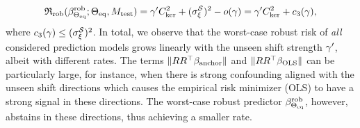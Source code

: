 \begin{equation*}
    \mathfrak{R}_{\mathrm{rob}}(\beta^{\mathrm{rob}}_{\Theta_{\mathrm{eq}}}; \Theta_{\mathrm{eq}}, M_{\mathrm{test}}) = \gamma' C_{\mathrm{ker}}^2 +  ({\sigma_\xi^{\mathcal{S}}})^2 - o(\gamma) = \gamma' C_{\mathrm{ker}}^2 + c_3(\gamma),
\end{equation*}
where $c_3(\gamma) \leq ({\sigma_\xi^{\mathcal{S}}})^2$.
In total, we observe that the worst-case robust risk of \emph{all} considered prediction models grows linearly with the unseen shift strength $\gamma'$, albeit with different rates. The terms $\| R R^\top \beta_{\text{anchor}} \|$ and $\| R R^\top \beta_{\mathrm{OLS}} \|$ can be particularly large, for instance, when there is strong confounding aligned with the unseen shift directions which causes the empirical risk minimizer (OLS) to have a strong signal in these directions. The worst-case robust predictor $\beta^{\mathrm{rob}}_{\Theta_{\mathrm{eq}}}$, however, abstains in these directions, thus achieving a smaller rate.
    
    
